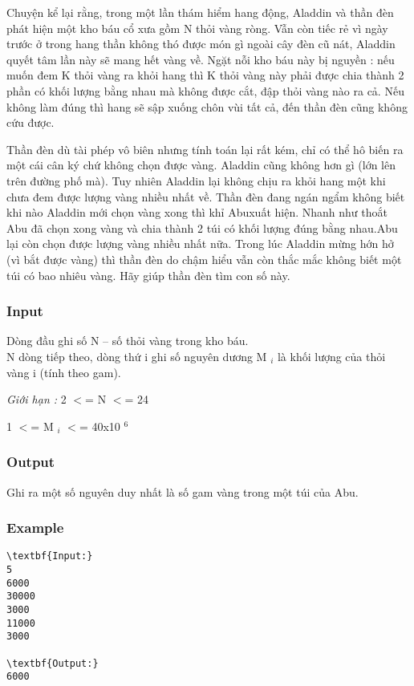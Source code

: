 

Chuyện kể lại rằng, trong một lần thám hiểm hang động, Aladdin và thần đèn phát hiện một kho báu cổ xưa gồm N thỏi vàng ròng. Vẫn còn tiếc rẻ vì ngày trước ở trong hang thần không thó được món gì ngoài cây đèn cũ nát, Aladdin quyết tâm lần này sẽ mang hết vàng về. Ngặt nỗi kho báu này bị nguyền : nếu muốn đem K thỏi vàng ra khỏi hang thì K thỏi vàng này phải được chia thành 2 phần có khối lượng bằng nhau mà không được cắt, đập thỏi vàng nào ra cả. Nếu không làm đúng thì hang sẽ sập xuống chôn vùi tất cả, đến thần đèn cũng không cứu được.

Thần đèn dù tài phép vô biên nhưng tính toán lại rất kém, chỉ có thể hô biến ra một cái cân ký chứ không chọn được vàng. Aladdin cũng không hơn gì (lớn lên trên đường phố mà). Tuy nhiên Aladdin lại không chịu ra khỏi hang một khi chưa đem được lượng vàng nhiều nhất về. Thần đèn đang ngán ngẩm không biết khi nào Aladdin mới chọn vàng xong thì khỉ Abuxuất hiện. Nhanh như thoắt Abu đã chọn xong vàng và chia thành 2 túi có khối lượng đúng bằng nhau.Abu lại còn chọn được lượng vàng nhiều nhất nữa. Trong lúc Aladdin mừng hớn hở (vì bắt được vàng) thì thần đèn do chậm hiểu vẫn còn thắc mắc không biết một túi có bao nhiêu vàng. Hãy giúp thần đèn tìm con số này.

\subsubsection{Input}

Dòng đầu ghi số N – số thỏi vàng trong kho báu.
\\N dòng tiếp theo, dòng thứ i ghi số nguyên dương M $_ i $ là khối lượng của thỏi vàng i (tính theo gam).

\emph{Giới hạn : } 2 $<$= N $<$= 24

1 $<$= M $_ i $ $<$= 40x10 $^ 6 $

\subsubsection{Output}

Ghi ra một số nguyên duy nhất là số gam vàng trong một túi của Abu.

\subsubsection{Example}
\begin{verbatim}
\textbf{Input:}
5
6000
30000
3000
11000
3000

\textbf{Output:}
6000\end{verbatim}